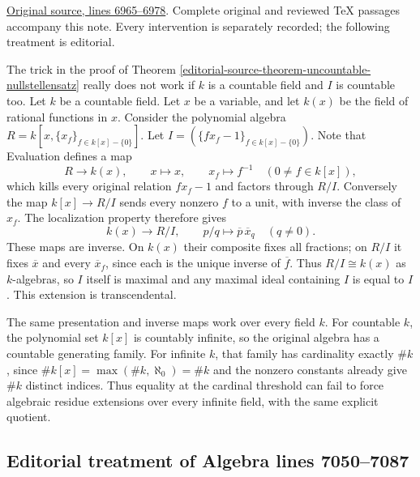 \hypertarget{algebra-context-063}{}

\noindent\href{https://github.com/stacks/stacks-project/blob/a04446e57ec1fbc252a871afcec7752fb2807b14/algebra.tex\#L6965}{Original source, lines 6965--6978}. Complete original and reviewed TeX passages accompany this note. Every intervention is separately recorded; the following treatment is editorial.


\begin{example}
\label{editorial-source-example-countable-trick-does-not-work}
The trick in the proof of
Theorem \ref{editorial-source-theorem-uncountable-nullstellensatz}
really does not work if $k$ is a countable field and $I$ is countable too.
Let $k$ be a countable field. Let $x$ be a variable,
and let $k(x)$ be the field of rational functions in $x$.
Consider the polynomial algebra $R = k[x, \{x_f\}_{f \in k[x]-\{0\}}]$.
Let $I = (\{fx_f - 1\}_{f\in k[x] - \{0\}})$. Note that
Evaluation defines a map
$$
R\longrightarrow k(x),\qquad x\longmapsto x,\qquad
x_f\longmapsto f^{-1}\quad(0\ne f\in k[x]),
$$
which kills every original relation $fx_f-1$ and factors through
$R/I$. Conversely the map $k[x]\to R/I$ sends every nonzero
$f$ to a unit, with inverse the class of $x_f$. The localization
property therefore gives
$$
k(x)\longrightarrow R/I,\qquad p/q\longmapsto
\overline p\,\overline{x}_q\quad(q\ne0).
$$
These maps are inverse. On $k(x)$ their composite fixes all fractions;
on $R/I$ it fixes $\overline x$ and every $\overline{x}_f$, since
each is the unique inverse of $\overline f$. Thus $R/I\cong k(x)$
as $k$-algebras, so $I$ itself is maximal and any maximal ideal
containing $I$ is equal to $I$. This extension is transcendental.

The same presentation and inverse maps work over every field $k$.
For countable $k$, the polynomial set $k[x]$ is countably infinite,
so the original algebra has a countable generating family.
For infinite $k$, that family has cardinality exactly $\#k$, since
$\#k[x]=\max(\#k,\aleph_0)=\#k$ and the nonzero constants already
give $\#k$ distinct indices. Thus equality at the cardinal threshold
can fail to force algebraic residue extensions over every infinite
field, with the same explicit quotient.
\end{example}


\subsection{Editorial treatment of Algebra lines 7050--7087}

